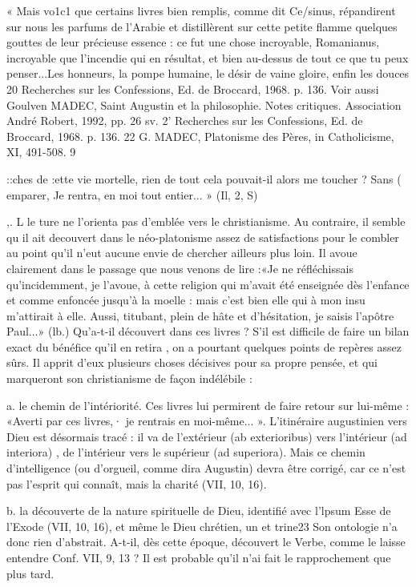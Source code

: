 « Mais vo1c1 que certains livres bien remplis, comme dit Ce/sinus, répandirent sur nous les parfums de l'Arabie et distillèrent sur cette petite flamme quelques gouttes de leur précieuse essence : ce fut une chose incroyable, Romanianus, incroyable que l'incendie qui en résultat, et bien au-dessus de tout ce que tu peux penser...Les honneurs, la pompe humaine, le désir de vaine gloire, enfin les douces
20 Recherches sur les Confessions, Ed. de Broccard, 1968. p. 136. Voir aussi Goulven MADEC, Saint Augustin et la philosophie. Notes critiques. Association André Robert, 1992, pp. 26 sv.
2' Recherches sur les Confessions, Ed. de Broccard, 1968. p. 136.
22 G. MADEC, Platonisme des Pères, in Catholicisme, XI, 491-508.
9
 
::ches de :ette vie mortelle, rien de tout cela pouvait-il alors me toucher ? Sans	(
emparer, Je rentra, en moi tout entier... » (Il, 2, S)

,. L  le ture ne l'orienta pas d'emblée vers le christianisme. Au contraire, il semble qu il ait decouvert dans le néo-platonisme assez de satisfactions pour le combler au point qu'il n'eut aucune envie de chercher ailleurs plus loin. Il avoue clairement dans le passage que nous venons de lire :«Je ne réfléchissais qu'incidemment, je l'avoue, à cette religion qui m'avait été enseignée dès l'enfance et comme enfoncée jusqu'à la moelle : mais c'est bien elle qui à mon insu m'attirait à elle. Aussi, titubant, plein de hâte et d'hésitation, je saisis l'apôtre Paul...» (lb.) Qu'a-t-il découvert dans ces livres ? S'il est difficile de faire un bilan exact du bénéfice qu'il en retira , on a pourtant quelques points de repères assez sûrs. Il   apprit  d'eux   plusieurs
choses  décisives  pour  sa  propre  pensée, et qui marqueront son christianisme
de façon indélébile :

a.	le  chemin de l'intériorité. Ces livres lui permirent de faire retour sur lui-même : «Averti par ces livres,· je rentrais en moi-même... ». L'itinéraire augustinien vers Dieu est désormais tracé : il va de l'extérieur (ab exterioribus) vers l'intérieur (ad interiora) , de l'intérieur vers le supérieur (ad superiora). Mais ce chemin d'intelligence (ou d'orgueil, comme dira Augustin) devra être corrigé, car ce n'est pas l'esprit qui connaît, mais la charité (VII, 10, 16).

b.	la découverte de la nature spirituelle de Dieu, identifié avec l'lpsum Esse de l'Exode (VII, 10, 16), et même le Dieu chrétien, un et trine23   Son ontologie n'a donc rien d'abstrait. A-t-il, dès cette époque, découvert le Verbe, comme le laisse entendre Conf. VII, 9, 13 ? Il est probable qu'il n'ai fait le rapprochement que plus tard.


